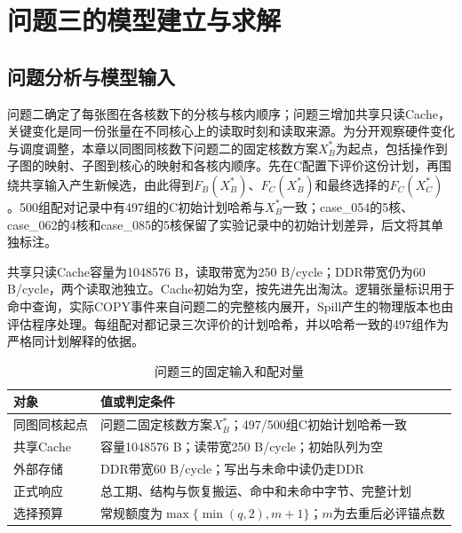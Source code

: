\section{问题三的模型建立与求解}
\label{sec:question-three}

\subsection{问题分析与模型输入}
问题二确定了每张图在各核数下的分核与核内顺序；问题三增加共享只读Cache，关键变化是同一份张量在不同核心上的读取时刻和读取来源。为分开观察硬件变化与调度调整，本章以同图同核数下问题二的固定核数方案$X_B^*$为起点，包括操作到子图的映射、子图到核心的映射和各核内顺序。先在C配置下评价这份计划，再围绕共享输入产生新候选，由此得到$F_B(X_B^*)$、$F_C(X_B^*)$和最终选择的$F_C(X_C^*)$。500组配对记录中有497组的C初始计划哈希与$X_B^*$一致；case\_054的5核、case\_062的4核和case\_085的5核保留了实验记录中的初始计划差异，后文将其单独标注。

共享只读Cache容量为1048576 B，读取带宽为250 B/cycle；DDR带宽仍为60 B/cycle，两个读取池独立。Cache初始为空，按先进先出淘汰。逻辑张量标识用于命中查询，实际COPY事件来自问题二的完整核内展开，Spill产生的物理版本也由评估程序处理。每组配对都记录三次评价的计划哈希，并以哈希一致的497组作为严格同计划解释的依据。
\begin{table}[H]\centering\caption{问题三的固定输入和配对量}\label{tab:c-inputs}
\begin{tabularx}{\linewidth}{lY}\toprule
对象 & 值或判定条件\\\midrule
同图同核起点 & 问题二固定核数方案$X_B^*$；497/500组C初始计划哈希一致\\
共享Cache & 容量1048576 B；读带宽250 B/cycle；初始队列为空\\
外部存储 & DDR带宽60 B/cycle；写出与未命中读仍走DDR\\
正式响应 & 总工期、结构与恢复搬运、命中和未命中字节、完整计划\\
选择预算 & 常规额度为$\max\{\min(q,2),m+1\}$；$m$为去重后必评锚点数\\\bottomrule
\end{tabularx}\end{table}

